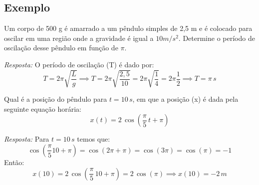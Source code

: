 \documentclass[12pt]{extarticle}
\newcommand{\<}{\langle}
\renewcommand{\>}{\rangle}
\theoremstyle{definition}
\begin{document}
\subsection{Exemplo}
Um corpo de 500 g é amarrado a um pêndulo simples de 2,5 m e é colocado para oscilar em uma região onde a gravidade é igual a $10 m/s^2$. Determine o período de oscilação desse pêndulo em função de $\pi$.

\textit{Resposta:} O período de oscilação (T) é dado por:
\begin{equation*}
    T = 2\pi \sqrt{\frac{L}{g}} \implies T = 2\pi\sqrt{\frac{2,5}{10}} = 2\pi \sqrt{\frac{1}{4}} = 2\pi\frac{1}{2} \implies \boxed{T = \pi\,s}
\end{equation*}

Qual é a posição do pêndulo para $t=10\,s$, em que a posição (x) é dada pela seguinte equação horária:
\begin{equation*}
    x(t) = 2\,\cos\left(\frac{\pi}{5}\,t + \pi\right)
\end{equation*}

\textit{Resposta:} Para $t=10\,s$ temos que:
\begin{equation*}
    \cos\left(\frac{\pi}{5}10 + \pi\right) = \cos\left(2\pi +\pi \right) = \cos(3\pi) = \cos(\pi) = -1
\end{equation*}
Então:
\begin{equation*}
    x(10) = 2\,\cos\left(\frac{\pi}{5}\,10 + \pi\right) = 2\,\cos(\pi) \implies \boxed{x(10) = -2\,m}
\end{equation*}
\end{document}
